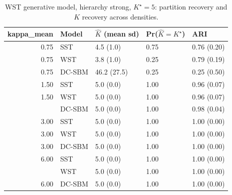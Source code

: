 \begin{table}
\centering
\caption{WST generative model, hierarchy strong, $K^\star=5$: partition recovery and $K$ recovery across densities.}
\centering
\begin{tabular}[t]{rllll}
\toprule
kappa_mean & Model & $\hat K$ (mean sd) & Pr($\hat K = K^\star$) & ARI\\
\midrule
0.75 & SST & 4.5 (1.0) & 0.75 & 0.76 (0.20)\\
0.75 & WST & 3.8 (1.0) & 0.25 & 0.79 (0.19)\\
0.75 & DC-SBM & 46.2 (27.5) & 0.25 & 0.25 (0.50)\\
1.50 & SST & 5.0 (0.0) & 1.00 & 0.96 (0.07)\\
1.50 & WST & 5.0 (0.0) & 1.00 & 0.96 (0.07)\\
\addlinespace
1.50 & DC-SBM & 5.0 (0.0) & 1.00 & 0.98 (0.04)\\
3.00 & SST & 5.0 (0.0) & 1.00 & 1.00 (0.00)\\
3.00 & WST & 5.0 (0.0) & 1.00 & 1.00 (0.00)\\
3.00 & DC-SBM & 5.0 (0.0) & 1.00 & 1.00 (0.00)\\
6.00 & SST & 5.0 (0.0) & 1.00 & 1.00 (0.00)\\
\addlinespace
6.00 & WST & 5.0 (0.0) & 1.00 & 1.00 (0.00)\\
6.00 & DC-SBM & 5.0 (0.0) & 1.00 & 1.00 (0.00)\\
\bottomrule
\end{tabular}
\end{table}

